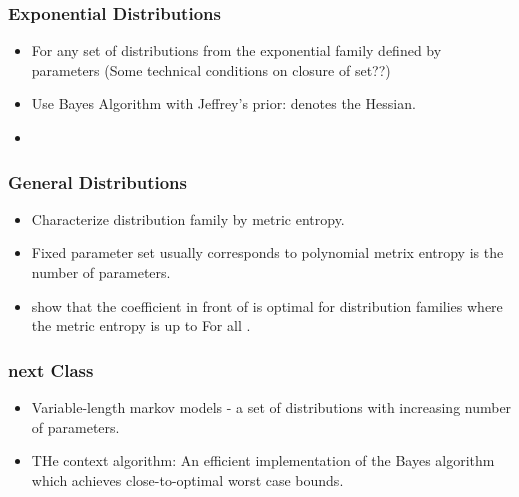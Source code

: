 \documentclass{beamer}
\begin{document}
\begin{frame}
\frametitle{Exponential Distributions}
\begin{itemize}
\item For any set of distributions from the exponential family
  defined by  parameters (Some technical conditions on closure
  of set??) \B{[Rissanen??]}
\item Use Bayes Algorithm with Jeffrey's prior:
\R{\[
\dweight{\btheta}{*} = \frac{1}{Z} 
\frac{1}{\sqrt{
\left| \left. {\mathbf H} \paren{D_{KL} (\btheta || \theta) } \right|_{\theta=\btheta} \right|
}}
\]}
 denotes the Hessian.
\item
{}
\end{itemize}
\end{frame}

\begin{frame}
\frametitle{General Distributions}
\begin{itemize}
\item Characterize distribution family by metric entropy.
\item Fixed parameter set usually corresponds to polynomial metrix
  entropy
\R{ \[
N(1/\epsilon) = O\paren{\frac{1}{\epsilon^d}}
\]}
 is the number of parameters.
\item
{} show that the coefficient in front of  is optimal for distribution families where the metric entropy is
  up to 
\R{\[ 
N(1/\epsilon) = O\paren{e^{\epsilon^{-\alpha}}}
\]}
For all .
\end{itemize}
\end{frame}

\begin{frame}
\frametitle{next Class}
\begin{itemize}
\item Variable-length markov models - a set of distributions with
  increasing number of parameters.
\item THe context algorithm: An efficient implementation of the Bayes
  algorithm which achieves close-to-optimal worst case bounds.
\end{itemize}
\end{frame}

%
\end{document}

